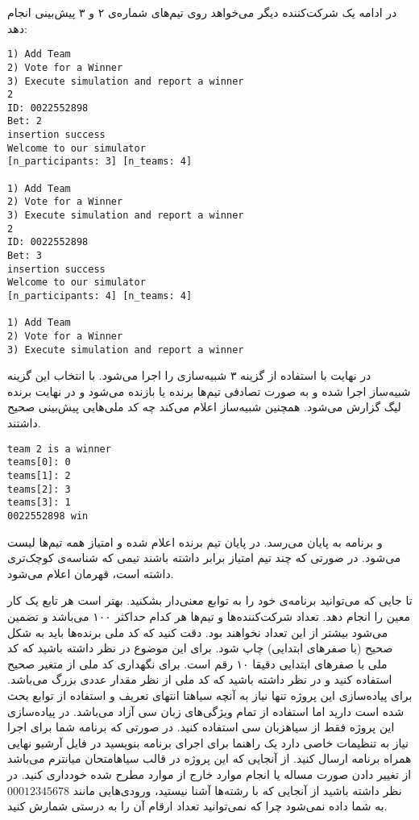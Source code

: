 در ادامه یک شرکت‌کننده دیگر می‌خواهد روی تیم‌های شماره‌ی ۲ و ۳ پیش‌بینی انجام دهد:

\begin{latin}
\begin{verbatim}
1) Add Team
2) Vote for a Winner
3) Execute simulation and report a winner
2
ID: 0022552898
Bet: 2
insertion success
Welcome to our simulator
[n_participants: 3] [n_teams: 4]

1) Add Team
2) Vote for a Winner
3) Execute simulation and report a winner
2
ID: 0022552898
Bet: 3
insertion success
Welcome to our simulator
[n_participants: 4] [n_teams: 4]

1) Add Team
2) Vote for a Winner
3) Execute simulation and report a winner
\end{verbatim}
\end{latin}

در نهایت با استفاده از گزینه ۳ شبیه‌سازی را اجرا می‌شود.
با انتخاب این گزینه شبیه‌ساز اجرا شده و به صورت تصادفی تیم‌ها برنده یا بازنده می‌شود
و در نهایت برنده لیگ گزارش می‌شود. همچنین شبیه‌ساز اعلام می‌کند چه کد ملی‌هایی پیش‌بینی صحیح داشتند.

\begin{latin}
\begin{verbatim}
team 2 is a winner
teams[0]: 0
teams[1]: 2
teams[2]: 3
teams[3]: 1
0022552898 win
\end{verbatim}
\end{latin}

و برنامه به پایان می‌رسد. در پایان تیم برنده اعلام شده و امتیاز همه تیم‌ها لیست می‌شود. در صورتی که چند تیم امتیاز برابر داشته باشند
تیمی که شناسه‌ی کوچک‌تری داشته است، قهرمان اعلام می‌شود.


     تا جایی که می‌توانید برنامه‌ی خود را به توابع معنی‌دار بشکنید. بهتر است هر تابع یک کار معین را انجام دهد.
     تعداد شرکت‌کننده‌ها و تیم‌ها هر کدام حداکثر ۱۰۰ می‌باشد و تضمین می‌شود بیشتر از این تعداد نخواهند بود.
     دقت کنید که کد ملی برنده‌ها باید به شکل صحیح (با صفرهای ابتدایی) چاپ شود. برای این موضوع در نظر داشته باشید که کد ملی با صفرهای ابتدایی دقیقا ۱۰ رقم است.
     برای نگهداری کد ملی از متغیر صحیح استفاده کنید و در نظر داشته باشید که کد ملی از نظر مقدار عددی بزرگ می‌باشد.
     برای پیاده‌سازی این پروژه تنها نیاز به آنچه ‌سیاه{تا انتهای تعریف و استفاده از توابع} بحث شده است دارید اما استفاده از تمام ویژگی‌های زبان سی آزاد می‌باشد.
     در پیاده‌سازی این پروژه فقط از ‌سیاه{زبان سی} استفاده کنید. در صورتی که برنامه شما برای اجرا نیاز به تنظیمات خاصی دارد یک راهنما برای اجرای برنامه بنویسید در فایل آرشیو نهایی همراه برنامه ارسال کنید.
     از آنجایی که این پروژه در قالب ‌سیاه{امتحان میانترم} می‌باشد از تغییر دادن صورت مساله یا انجام موارد خارج از موارد مطرح شده خودداری کنید.
     در نظر داشته باشید از آنجایی که با رشته‌ها آشنا نیستید، ورودی‌هایی مانند $00012345678$ به شما داده نمی‌شود چرا که نمی‌توانید تعداد ارقام آن را به درستی شمارش کنید.

